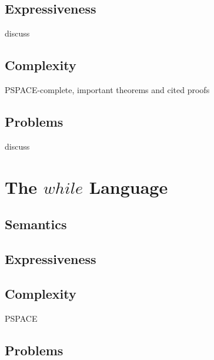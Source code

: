 \documentclass[]{article}
\begin{document}
\subsection{Expressiveness}
discuss
\subsection{Complexity}
PSPACE-complete,
important theorems and cited proofs
\subsection{Problems}
discuss

\section{The $while$ Language}
\subsection{Semantics}
\subsection{Expressiveness}
\subsection{Complexity}
PSPACE
\subsection{Problems}
\end{document}
